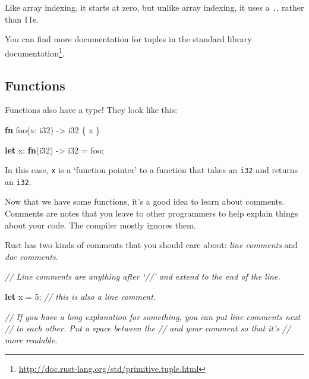 \documentclass[a4paper,]{book}
\newenvironment{Shaded}{\begin{snugshade}}{\end{snugshade}}
\newcommand{\KeywordTok}[1]{\textcolor[rgb]{0.13,0.29,0.53}{\textbf{{#1}}}}
\newcommand{\DataTypeTok}[1]{\textcolor[rgb]{0.13,0.29,0.53}{{#1}}}
\newcommand{\DecValTok}[1]{\textcolor[rgb]{0.00,0.00,0.81}{{#1}}}
\newcommand{\CommentTok}[1]{\textcolor[rgb]{0.56,0.35,0.01}{\textit{{#1}}}}
\newcommand{\NormalTok}[1]{{#1}}
\renewcommand{\href}[2]{#2\footnote{\url{#1}}}
\begin{document}
Like array indexing, it starts at zero, but unlike array indexing, it
uses a \texttt{.}, rather than \texttt{{[}{]}}s.

You can find more documentation for tuples
\href{http://doc.rust-lang.org/std/primitive.tuple.html}{in the standard
library documentation}.

\subsection{Functions}\label{functions}

Functions also have a type! They look like this:

\begin{Shaded}
\begin{Highlighting}[]
\KeywordTok{fn} \NormalTok{foo(x: }\DataTypeTok{i32}\NormalTok{) -> }\DataTypeTok{i32} \NormalTok{\{ x \}}

\KeywordTok{let} \NormalTok{x: }\KeywordTok{fn}\NormalTok{(}\DataTypeTok{i32}\NormalTok{) -> }\DataTypeTok{i32} \NormalTok{= foo;}
\end{Highlighting}
\end{Shaded}

In this case, \texttt{x} is a `function pointer' to a function that
takes an \texttt{i32} and returns an \texttt{i32}.


Now that we have some functions, it's a good idea to learn about
comments. Comments are notes that you leave to other programmers to help
explain things about your code. The compiler mostly ignores them.

Rust has two kinds of comments that you should care about: \emph{line
comments} and \emph{doc comments}.

\begin{Shaded}
\begin{Highlighting}[]
\CommentTok{// Line comments are anything after ‘//’ and extend to the end of the line.}

\KeywordTok{let} \NormalTok{x = }\DecValTok{5}\NormalTok{; }\CommentTok{// this is also a line comment.}

\CommentTok{// If you have a long explanation for something, you can put line comments next}
\CommentTok{// to each other. Put a space between the // and your comment so that it’s}
\CommentTok{// more readable.}
\end{Highlighting}
\end{Shaded}
\end{document}
